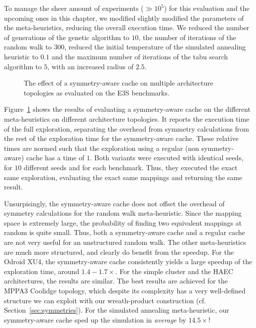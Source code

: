 To manage the sheer amount of experiments ($\gg 10^5$) for this evaluation and the upcoming ones in this chapter, we modified slightly modified the parameters of the meta-heuristics, reducing the overall execution time.
We reduced the number of generations of the genetic algorithm to $10$, the number of iterations of the random walk to $300$, reduced the initial temperature of the simulated annealing heuristic to $0.1$ and the maximum number of iterations of the tabu search algorithm to $5$, with an increased radius of $2.5$.

\begin{figure}[h]
	\centering
   \resizebox{0.95\textwidth}{!}{}
	\caption{The effect of a symmetry-aware cache on multiple architecture topologies as evaluated on the \ac{E3S} benchmarks.}
	\label{fig:symmetry_cache}
\end{figure}


Figure~\ref{fig:symmetry_cache} shows the results of evaluating a symmetry-aware cache on the different meta-heuristics on different architecture topologies.
It reports the execution time of the full exploration, separating the overhead from symmetry calculations from the rest of the exploration time for the symmetry-aware cache.
These relative times are normed such that the exploration using a regular (non symmetry-aware) cache has a time of $1$. Both variants were executed with identical seeds, for $10$ different seeds and for each benchmark. 
Thus, they executed the exact same exploration, evaluating the exact same mappings and returning the same result.

Unsurpisingly, the symmetry-aware cache does not offset the overhead of symmetry calculations for the random walk meta-heuristic.
Since the mapping space is extremely large, the probability of finding two equivalent mappings at random is quite small. 
Thus, both a symmetry-aware cache and a regular cache are not very useful for an unstructured random walk.
The other meta-heuristics are much more structured, and clearly do benefit from the speedup.
For the Odroid XU4, the symmetry-aware cache consistently yields a large speedup of the exploration time, around $1.4-1.7 \times$.
For the simple cluster and the \ac{HAEC} architectures, the results are similar.
The best results are achieved for the MPPA3 Coolidge topology, which despite its complexity has a very well-defined structure we can exploit with our wreath-product construction (cf. Section~\ref{sec:symmetries}).
For the simulated annealing meta-heuristic, our symmetry-aware cache sped up the simulation in \emph{average} by $14.5 \times$!

